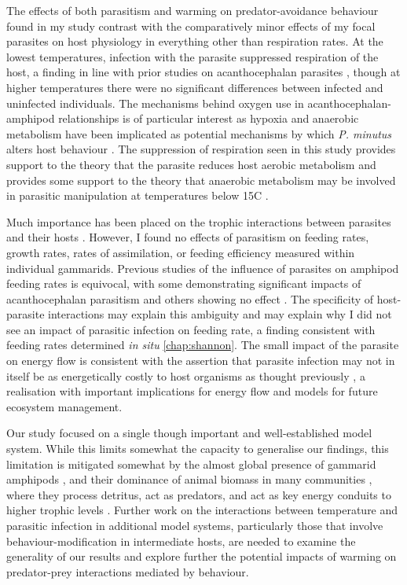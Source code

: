 The effects of both parasitism and warming on predator-avoidance behaviour found in my study contrast with the comparatively minor effects of my focal parasites on host physiology in everything other than respiration rates. At the lowest temperatures, infection with the parasite suppressed respiration of the host, a finding in line with prior studies on acanthocephalan parasites \citep{rumpus1974}, though at higher temperatures there were no significant differences between infected and uninfected individuals. The mechanisms behind oxygen use in acanthocephalan-amphipod relationships is of  particular interest as hypoxia and anaerobic metabolism have been implicated as potential mechanisms by which \emph{P. minutus} alters host behaviour \citep{perrot2016}. The suppression of respiration seen in this study provides support to the theory that the parasite reduces host aerobic metabolism and provides some support to the theory that anaerobic metabolism may be involved in parasitic manipulation at temperatures below 15\degree C . 

Much importance has been placed on the trophic interactions between parasites and their hosts \citep{vanveen2008, chen2011, benesh2014}. However, I found no effects of parasitism on feeding rates, growth rates, rates of assimilation, or feeding efficiency measured within individual gammarids. Previous studies of the influence of parasites on amphipod feeding rates is equivocal, with some demonstrating significant impacts of acanthocephalan parasitism \citep{labaude2016, laverty2017} and others showing no effect \citep{fielding2003}. The specificity of host-parasite interactions may explain this ambiguity and may explain why I did not see an impact of parasitic infection on feeding rate, a finding consistent with feeding rates determined \emph{in situ} \ref{chap:shannon}. The small impact of the parasite on energy flow is consistent with the assertion that parasite infection may not in itself be as energetically costly to host organisms as thought previously \citep{labaude2015}, a realisation with important implications for energy flow and models for future ecosystem management.

Our study focused on a single \textemdash though important and well-established \textemdash model system. While this limits somewhat the capacity to generalise our findings, this limitation is mitigated somewhat by the almost global presence of gammarid amphipods \citep{karaman1977, westram2011}, and their dominance of animal biomass in many communities \citep{mortensen1982}, where they process detritus, act as predators, and act as key energy conduits to higher trophic levels \citep{macneil1997, little2018}. Further work on the interactions between temperature and parasitic infection in additional model systems, particularly those that involve behaviour-modification in intermediate hosts, are needed to examine the generality of our results and explore further the potential impacts of warming on predator-prey interactions mediated by behaviour. 

